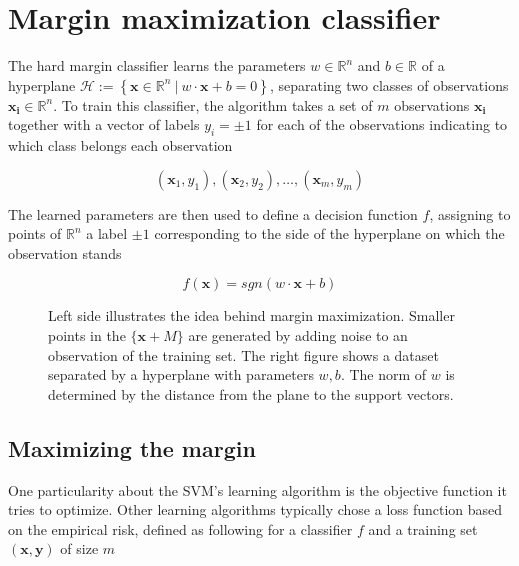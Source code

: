 \section {Margin maximization classifier}

The hard margin classifier learns the parameters $w \in \mathbb{R}^n$ and $b \in \mathbb{R}$ of a hyperplane $\mathscr{H} := \left\{ \mathbf{x} \in \mathbb{R}^n\ |\ w \cdot \mathbf{x} + b = 0\right\}$, separating two classes of observations $\mathbf{x_i} \in \mathbb{R}^n$. To train this classifier, the algorithm takes a set of $m$ observations $\mathbf{x_i}$ together with a vector of labels $y_i = \pm 1$ for each of the observations indicating to which class belongs each observation 

\begin{equation*}
(\mathbf{x}_1, y_1), (\mathbf{x}_2, y_2), \dotsc, (\mathbf{x}_m, y_m)
\end{equation*}

The learned parameters are then used to define a decision function $f$, assigning to points of $\mathbb{R}^n$ a label $\pm 1$ corresponding to the side of the hyperplane on which the observation stands

\begin{equation}
  f(\mathbf{x}) = sgn(w \cdot \mathbf{x} + b)
\end{equation}

\begin{figure*}
  \begin{minipage}{.5\textwidth}
    \centering
    
  \end{minipage}%
  \begin{minipage}{.5\textwidth}
    \centering
    
  \end{minipage}

  \caption{
    Left side illustrates the idea behind margin maximization. Smaller points in the $\{ \mathbf{x} + M \}$ are generated by adding noise to an observation of the training set. The right figure shows a dataset separated by a hyperplane with parameters $w, b$. The norm of $w$ is determined by the distance from the plane to the support vectors.
  }
\end{figure*}

\subsection {Maximizing the margin}

One particularity about the SVM's learning algorithm is the objective function it tries to optimize. Other learning algorithms typically chose a loss function based on the empirical risk, defined as following for a classifier $f$ and a training set $(\mathbf{x}, \mathbf{y})$ of size $m$

